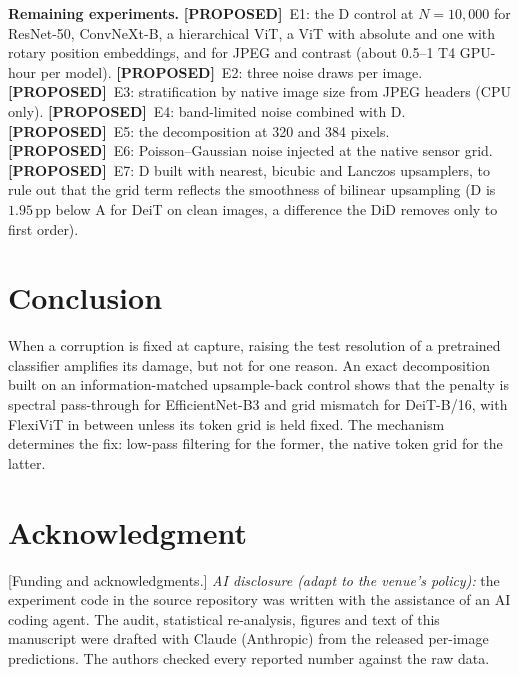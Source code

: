 \documentclass[conference]{IEEEtran}
\newcommand{\pp}{\,\mathrm{pp}}
\newcommand{\proposed}{\textbf{[PROPOSED]}}
\begin{document}
\textbf{Remaining experiments.} \proposed~E1: the D control at $N=10{,}000$ for ResNet-50, ConvNeXt-B, a hierarchical ViT, a ViT with absolute and one with rotary position embeddings, and for JPEG and contrast (about 0.5--1 T4 GPU-hour per model). \proposed~E2: three noise draws per image. \proposed~E3: stratification by native image size from JPEG headers (CPU only). \proposed~E4: band-limited noise combined with D. \proposed~E5: the decomposition at 320 and 384 pixels. \proposed~E6: Poisson--Gaussian noise injected at the native sensor grid. \proposed~E7: D built with nearest, bicubic and Lanczos upsamplers, to rule out that the grid term reflects the smoothness of bilinear upsampling (D is $1.95\pp$ below A for DeiT on clean images, a difference the DiD removes only to first order).

\section{Conclusion}
When a corruption is fixed at capture, raising the test resolution of a pretrained classifier amplifies its damage, but not for one reason. An exact decomposition built on an information-matched upsample-back control shows that the penalty is spectral pass-through for EfficientNet-B3 and grid mismatch for DeiT-B/16, with FlexiViT in between unless its token grid is held fixed. The mechanism determines the fix: low-pass filtering for the former, the native token grid for the latter.

\section*{Acknowledgment}
[Funding and acknowledgments.] \emph{AI disclosure (adapt to the venue's policy):} the experiment code in the source repository was written with the assistance of an AI coding agent. The audit, statistical re-analysis, figures and text of this manuscript were drafted with Claude (Anthropic) from the released per-image predictions. The authors checked every reported number against the raw data.
\end{document}
